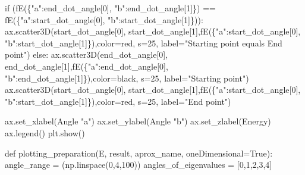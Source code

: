 \documentclass[
  letterpaper,
  DIV=11,
  numbers=noendperiod]{scrartcl}
\newenvironment{Shaded}{\begin{snugshade}}{\end{snugshade}}
\newcommand{\ControlFlowTok}[1]{\textcolor[rgb]{0.00,0.23,0.31}{#1}}
\newcommand{\DecValTok}[1]{\textcolor[rgb]{0.68,0.00,0.00}{#1}}
\newcommand{\KeywordTok}[1]{\textcolor[rgb]{0.00,0.23,0.31}{#1}}
\newcommand{\NormalTok}[1]{\textcolor[rgb]{0.00,0.23,0.31}{#1}}
\newcommand{\OperatorTok}[1]{\textcolor[rgb]{0.37,0.37,0.37}{#1}}
\newcommand{\StringTok}[1]{\textcolor[rgb]{0.13,0.47,0.30}{#1}}
\newcommand{\VariableTok}[1]{\textcolor[rgb]{0.07,0.07,0.07}{#1}}
\begin{document}
\begin{Shaded}
\begin{Highlighting}[]
        \ControlFlowTok{if}\NormalTok{ (fE(\{}\StringTok{"a"}\NormalTok{:end\_dot\_angle[}\DecValTok{0}\NormalTok{], }\StringTok{"b"}\NormalTok{:end\_dot\_angle[}\DecValTok{1}\NormalTok{]\}) }\OperatorTok{==}\NormalTok{ fE(\{}\StringTok{"a"}\NormalTok{:start\_dot\_angle[}\DecValTok{0}\NormalTok{], }\StringTok{"b"}\NormalTok{:start\_dot\_angle[}\DecValTok{1}\NormalTok{]\})):}
\NormalTok{            ax.scatter3D(start\_dot\_angle[}\DecValTok{0}\NormalTok{], start\_dot\_angle[}\DecValTok{1}\NormalTok{],fE(\{}\StringTok{"a"}\NormalTok{:start\_dot\_angle[}\DecValTok{0}\NormalTok{], }\StringTok{"b"}\NormalTok{:start\_dot\_angle[}\DecValTok{1}\NormalTok{]\}),color}\OperatorTok{=}\StringTok{\textquotesingle{}red\textquotesingle{}}\NormalTok{, s}\OperatorTok{=}\DecValTok{25}\NormalTok{, label}\OperatorTok{=}\StringTok{"Starting point equals End point"}\NormalTok{)}
        \ControlFlowTok{else}\NormalTok{:}
\NormalTok{            ax.scatter3D(end\_dot\_angle[}\DecValTok{0}\NormalTok{], end\_dot\_angle[}\DecValTok{1}\NormalTok{],fE(\{}\StringTok{"a"}\NormalTok{:end\_dot\_angle[}\DecValTok{0}\NormalTok{], }\StringTok{"b"}\NormalTok{:end\_dot\_angle[}\DecValTok{1}\NormalTok{]\}),color}\OperatorTok{=}\StringTok{\textquotesingle{}black\textquotesingle{}}\NormalTok{, s}\OperatorTok{=}\DecValTok{25}\NormalTok{, label}\OperatorTok{=}\StringTok{"Starting point"}\NormalTok{)}
\NormalTok{            ax.scatter3D(start\_dot\_angle[}\DecValTok{0}\NormalTok{], start\_dot\_angle[}\DecValTok{1}\NormalTok{],fE(\{}\StringTok{"a"}\NormalTok{:start\_dot\_angle[}\DecValTok{0}\NormalTok{], }\StringTok{"b"}\NormalTok{:start\_dot\_angle[}\DecValTok{1}\NormalTok{]\}),color}\OperatorTok{=}\StringTok{\textquotesingle{}red\textquotesingle{}}\NormalTok{, s}\OperatorTok{=}\DecValTok{25}\NormalTok{, label}\OperatorTok{=}\StringTok{"End point"}\NormalTok{)}


\NormalTok{        ax.set\_xlabel(}\StringTok{\textquotesingle{}Angle "a"\textquotesingle{}}\NormalTok{)}
\NormalTok{        ax.set\_ylabel(}\StringTok{\textquotesingle{}Angle "b"\textquotesingle{}}\NormalTok{)}
\NormalTok{        ax.set\_zlabel(}\StringTok{\textquotesingle{}Energy\textquotesingle{}}\NormalTok{)}
\NormalTok{        ax.legend()}
\NormalTok{        plt.show()}

    \KeywordTok{def}\NormalTok{ plotting\_preparation(E, result, aprox\_name, oneDimensional}\OperatorTok{=}\VariableTok{True}\NormalTok{):}
\NormalTok{        angle\_range }\OperatorTok{=}\NormalTok{ (np.linspace(}\DecValTok{0}\NormalTok{,}\DecValTok{4}\NormalTok{,}\DecValTok{100}\NormalTok{))}
\NormalTok{        angles\_of\_eigenvalues }\OperatorTok{=}\NormalTok{ [}\DecValTok{0}\NormalTok{,}\DecValTok{1}\NormalTok{,}\DecValTok{2}\NormalTok{,}\DecValTok{3}\NormalTok{,}\DecValTok{4}\NormalTok{]}


\end{Highlighting}
\end{Shaded}
\end{document}
